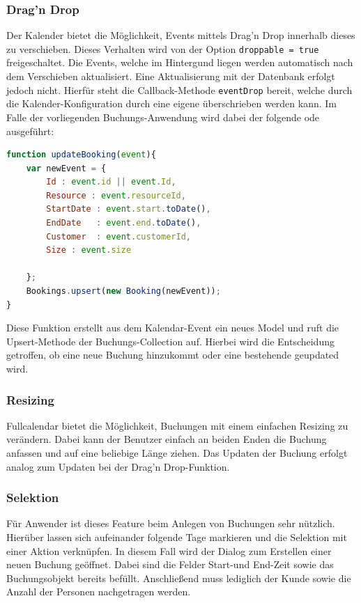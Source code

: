\subsubsection{Drag'n Drop}
Der Kalender bietet die Möglichkeit, Events mittels Drag'n Drop innerhalb dieses zu verschieben. Dieses Verhalten wird von der Option \texttt{droppable = true} freigeschaltet.
Die Events, welche im Hintergund liegen werden automatisch nach dem Verschieben aktualisiert.
Eine Aktualisierung mit der Datenbank erfolgt jedoch nicht. Hierfür steht die Callback-Methode \texttt{eventDrop} bereit, welche durch die Kalender-Konfiguration
durch eine eigene überschrieben werden kann. Im Falle der vorliegenden Buchungs-Anwendung wird dabei der folgende ode ausgeführt:

 \begin{lstlisting}[language=Javascript, label=code_exampleUpdateBooking, caption=Aktualisierungscode nach einem Drag\'nDrop-Event]
function updateBooking(event){
    var newEvent = {
        Id : event.id || event.Id,
        Resource : event.resourceId,
        StartDate : event.start.toDate(),
        EndDate   : event.end.toDate(),
        Customer  : event.customerId,
        Size : event.size

    };
    Bookings.upsert(new Booking(newEvent));
}
 \end{lstlisting}

 Diese Funktion erstellt aus dem Kalendar-Event ein neues Model und ruft die Upsert-Methode der Buchungs-Collection auf.
 Hierbei wird die Entscheidung getroffen, ob eine neue Buchung hinzukommt oder eine bestehende geupdated wird.

 \subsubsection{Resizing}
 Fullcalendar bietet die Möglichkeit, Buchungen mit einem einfachen Resizing zu verändern. Dabei kann der Benutzer einfach an beiden Enden die Buchung anfassen und auf eine beliebige Länge ziehen.
 Das Updaten der Buchung erfolgt analog zum Updaten bei der Drag'n Drop-Funktion.

\subsubsection{Selektion}
Für Anwender ist dieses Feature beim Anlegen von Buchungen sehr nützlich. Hierüber lassen sich aufeinander folgende Tage markieren und die Selektion mit einer Aktion verknüpfen.
In diesem Fall wird der Dialog zum Erstellen einer neuen Buchung geöffnet.
Dabei sind die Felder Start-und End-Zeit sowie das Buchungsobjekt bereits befüllt. Anschließend muss lediglich der Kunde sowie die Anzahl der Personen nachgetragen werden.